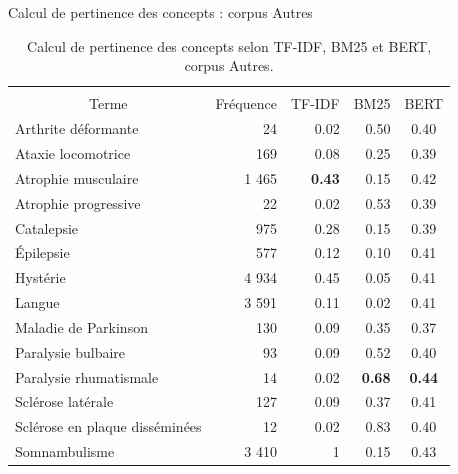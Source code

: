 \begin{frame}{Calcul de pertinence des concepts : corpus \og{}Autres\fg{}}
    \footnotesize
\begin{table}[]
\begin{tabular}{|l|cccc|}
\hline
\multicolumn{1}{|c|}{{ }} &
  \multicolumn{4}{c|}{\cellcolor[HTML]{DAE8FC}{ Corpus \og{}Autres\fg{}}} \\ \cline{2-5} 
\multicolumn{1}{|c|}{\multirow{}{}{{Terme}}} &
  {Fréquence} &
  {TF-IDF} &
  {BM25} &
  {BERT} \\ \hline
{Arthrite déformante} &
  \multicolumn{1}{|r|}{{24}} &
  \multicolumn{1}{|r|}{{0.02}} &
  \multicolumn{1}{|r|}{{0.50}} &
  {0.40} \\ \hline
{Ataxie locomotrice} &
  \multicolumn{1}{|r|}{{169}} &
  \multicolumn{1}{|r|}{{0.08}} &
  \multicolumn{1}{|r|}{{0.25}} &
  {0.39} \\ \hline
{Atrophie musculaire} &
  \multicolumn{1}{|r|}{{1 465}} &
  \multicolumn{1}{|r|}{{\textbf{0.43}}} &
  \multicolumn{1}{|r|}{{0.15}} &
  {0.42} \\ \hline
{Atrophie progressive} &
  \multicolumn{1}{|r|}{{22}} &
  \multicolumn{1}{|r|}{{0.02}} &
  \multicolumn{1}{|r|}{{0.53}} &
  {0.39} \\ \hline
{Catalepsie} &
  \multicolumn{1}{|r|}{{975}} &
  \multicolumn{1}{|r|}{{0.28}} &
  \multicolumn{1}{|r|}{{0.15}} &
  {0.39} \\ \hline
{Épilepsie} &
  \multicolumn{1}{|r|}{{577}} &
  \multicolumn{1}{|r|}{{0.12}} &
  \multicolumn{1}{|r|}{{0.10}} &
  {0.41} \\ \hline
{Hystérie} &
  \multicolumn{1}{|r|}{{4 934}} &
  \multicolumn{1}{|r|}{{0.45}} &
  \multicolumn{1}{|r|}{{0.05}} &
  {0.41} \\ \hline
{Langue} &
  \multicolumn{1}{|r|}{{3 591}} &
  \multicolumn{1}{|r|}{{0.11}} &
  \multicolumn{1}{|r|}{{0.02}} &
  {0.41} \\ \hline
{Maladie de Parkinson} &
  \multicolumn{1}{|r|}{{130}} &
  \multicolumn{1}{|r|}{{0.09}} &
  \multicolumn{1}{|r|}{{0.35}} &
  {0.37} \\ \hline
{Paralysie bulbaire} &
  \multicolumn{1}{|r|}{{93}} &
  \multicolumn{1}{|r|}{{0.09}} &
  \multicolumn{1}{|r|}{{0.52}} &
  {0.40} \\ \hline
{Paralysie rhumatismale} &
  \multicolumn{1}{|r|}{{14}} &
  \multicolumn{1}{|r|}{{0.02}} &
  \multicolumn{1}{|r|}{{\textbf{0.68}}} &
  {\textbf{0.44}} \\ \hline
{Sclérose latérale} &
  \multicolumn{1}{|r|}{{127}} &
  \multicolumn{1}{|r|}{{0.09}} &
  \multicolumn{1}{|r|}{{0.37}} &
  {0.41} \\ \hline
{Sclérose en plaque disséminées} &
  \multicolumn{1}{|r|}{{12}} &
  \multicolumn{1}{|r|}{{0.02}} &
  \multicolumn{1}{|r|}{{0.83}} &
  {0.40} \\ \hline
{Somnambulisme} &
  \multicolumn{1}{|r|}{{3 410}} &
  \multicolumn{1}{|r|}{{1}} &
  \multicolumn{1}{|r|}{{0.15}} &
  {0.43} \\ \hline
\end{tabular}
\caption{Calcul de pertinence des concepts selon TF-IDF, BM25 et BERT, corpus \og{}Autres\fg{}.}
\end{table}
\end{frame}

